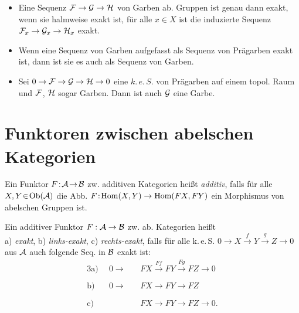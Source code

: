 \documentclass{cheat-sheet}
\newcommand{\keS}{k.\,e.\,S.} %
\begin{document}
\begin{lem}
  \begin{itemize}
    \item Eine Sequenz $\mathcal{F} \to \mathcal{G} \to \mathcal{H}$ von Garben ab. Gruppen ist genau dann exakt, wenn sie halmweise exakt ist, \dh{} für alle $x \in X$ ist die induzierte Sequenz $\mathcal{F}_x \to \mathcal{G}_x \to \mathcal{H}_x$ exakt.
    \item Wenn eine Sequenz von Garben aufgefasst als Sequenz von Prägarben exakt ist, dann ist sie es auch als Sequenz von Garben.
    \item Sei $0 \to \mathcal{F} \to \mathcal{G} \to \mathcal{H} \to 0$ eine $\keS{}$ von Prägarben auf einem topol. Raum und $\mathcal{F}$, $\mathcal{H}$ sogar Garben. Dann ist auch $\mathcal{G}$ eine Garbe.
  \end{itemize}
\end{lem}

\section{Funktoren zwischen abelschen Kategorien}

\begin{defn}
  Ein Funktor $F \!:\! \mathcal{A} \!\to\! \mathcal{B}$ zw. additiven Kategorien heißt \emph{additiv}, falls für alle $X, Y \!\in\! \operatorname{Ob}(\mathcal{A})$ die Abb. $F \!:\! \operatorname{Hom}(X, Y) \to \operatorname{Hom}(FX, FY)$ ein Morphismus von abelschen Gruppen ist.
\end{defn}


\begin{defn}
  Ein additiver Funktor $F : \mathcal{A} \to \mathcal{B}$ zw. ab. Kategorien heißt \\
  a) \emph{exakt}, b) \emph{links-exakt}, c) \emph{rechts-exakt}, falls für alle \keS{}
  $0 \to X \xrightarrow{f} Y \xrightarrow{g} Z \to 0$
  aus $\mathcal{A}$ auch folgende Seq. in $\mathcal{B}$ exakt ist:
  \begin{alignat*}{3}
    \text{a)} \enspace & 0 \to &&\, FX \xrightarrow{Ff} FY \xrightarrow{Fg} FZ \to 0 \\[-5pt]
    \text{b)} \enspace & 0 \to &&\, FX \xrightarrow{\phantom{Ff}} FY \xrightarrow{\phantom{Fg}} FZ \\[-5pt]
    \text{c)} \enspace & &&\, FX \xrightarrow{\phantom{Ff}} FY \xrightarrow{\phantom{Fg}} FZ \to 0.
  \end{alignat*}
\end{defn}
\end{document}
